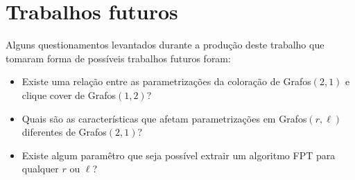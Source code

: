 \section{Trabalhos futuros}
Alguns questionamentos levantados durante a produção deste trabalho que tomaram forma de possíveis trabalhos futuros foram:
\begin{itemize}
  \item Existe uma relação entre as parametrizações da coloração de Grafos$(2,1)$ e clique cover de Grafos$(1,2)$?
  \item Quais são as características que afetam parametrizações em Grafos$(r,\ell)$ diferentes de Grafos$(2,1)$?
  \item Existe algum paramêtro que seja possível extrair um algoritmo FPT para qualquer $r$ ou $\ell$?
\end{itemize}
